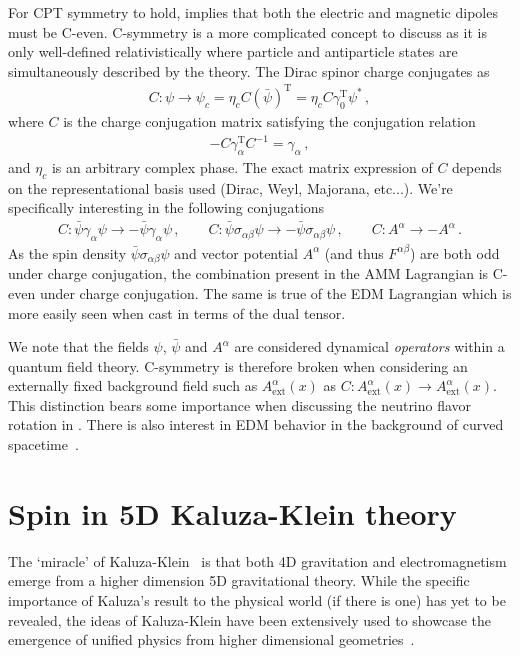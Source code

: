 For CPT symmetry to hold,  implies that both the electric and magnetic dipoles must be C-even. C-symmetry is a more complicated concept to discuss as it is only well-defined relativistically where particle and antiparticle states are simultaneously described by the theory. The Dirac spinor charge conjugates as
\begin{align}
    \label{c:1}
    C:\psi\rightarrow\psi_{c}=\eta_{c}C(\bar\psi)^\mathrm{T}= \eta_{c}C\gamma_{0}^\mathrm{T}\psi^{*}\,,
\end{align}
where $C$ is the charge conjugation matrix satisfying the conjugation relation
\begin{align}
    \label{c:2}
    -C\gamma_{\alpha}^\mathrm{T}C^{-1}=\gamma_{\alpha}\,,
\end{align}
and $\eta_{c}$ is an arbitrary complex phase. The exact matrix expression of $C$ depends on the representational basis used (Dirac, Weyl, Majorana, etc...). We're specifically interesting in the following conjugations
\begin{align}
    \label{c:3}
    C:\bar\psi\gamma_{\alpha}\psi\rightarrow-\bar\psi\gamma_{\alpha}\psi\,,\qquad
    C:\bar\psi\sigma_{\alpha\beta}\psi\rightarrow-\bar\psi\sigma_{\alpha\beta}\psi\,,\qquad
    C:A^{\alpha}\rightarrow-A^{\alpha}\,.
\end{align}
As the spin density $\bar\psi\sigma_{\alpha\beta}\psi$ and vector potential $A^{\alpha}$ (and thus $F^{\alpha\beta}$) are both odd under charge conjugation, the combination present in the AMM Lagrangian  is C-even under charge conjugation. The same is true of the EDM Lagrangian  which is more easily seen when cast in terms of the dual tensor.

We note that the fields $\psi$, $\bar\psi$ and $A^{\alpha}$ are considered dynamical \emph{operators} within a quantum field theory. C-symmetry is therefore broken when considering an externally fixed background field such as $A_\mathrm{ext}^{\alpha}(x)$ as $C:A_\mathrm{ext}^{\alpha}(x)\rightarrow A_\mathrm{ext}^{\alpha}(x)$. This distinction bears some importance when discussing the neutrino flavor rotation in . There is also interest in EDM behavior in the background of curved spacetime~\citep{Filho:2023lqe}.

\section{Spin in 5D Kaluza-Klein theory}
\label{sec:kk}
The `miracle' of Kaluza-Klein~\citep{theodor1921unitatsproblem,klein1926quantentheorie} is that both 4D gravitation and electromagnetism emerge from a higher dimension 5D gravitational theory. While the specific importance of Kaluza's result to the physical world (if there is one) has yet to be revealed, the ideas of Kaluza-Klein have been extensively used to showcase the emergence of unified physics from higher dimensional geometries~\citep{Ortin:2015hya}.

